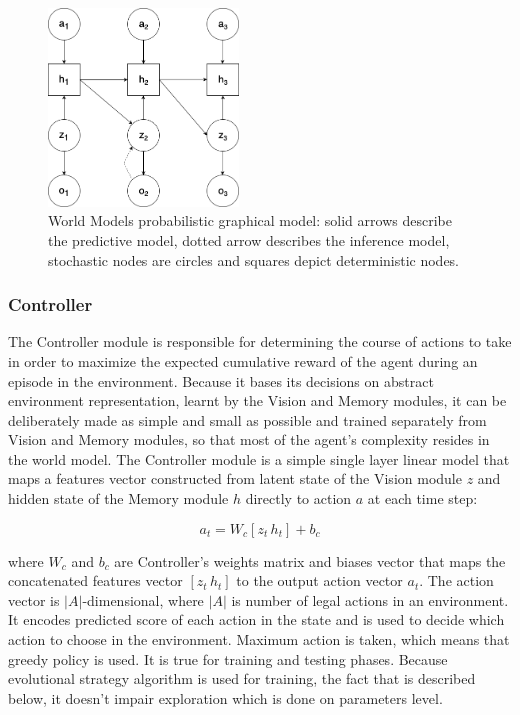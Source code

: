 \begin{figure}[H]
\includegraphics[width=0.45\textwidth,keepaspectratio]{figures/WorldModels/prob_graph_model.png}
\caption[World Models probabilistic graphical model]{World Models probabilistic graphical model: solid arrows describe the predictive model, dotted arrow describes the inference model, stochastic nodes are circles and squares depict deterministic nodes.}
\label{Fig.WorldModelsPGM}
\end{figure}

\subsubsection{Controller}

The Controller module is responsible for determining the course of actions to take in order to maximize the expected cumulative reward of the agent during an episode in the environment. Because it bases its decisions on abstract environment representation, learnt by the Vision and Memory modules, it can be deliberately made as simple and small as possible and trained separately from Vision and Memory modules, so that most of the agent’s complexity resides in the world model. The Controller module is a simple single layer linear model that maps a features vector constructed from latent state of the Vision module $z$ and hidden state of the Memory module $h$ directly to action $a$ at each time step:

$$a_t = W_c[z_t\,h_t] + b_c$$

where $W_c$ and $b_c$ are Controller's weights matrix and biases vector that maps the concatenated features vector $[z_t\,h_t]$ to the output action vector $a_t$. The action vector is $|A|$-dimensional, where $|A|$ is number of legal actions in an environment. It encodes predicted score of each action in the state and is used to decide which action to choose in the environment. Maximum action is taken, which means that greedy policy is used. It is true for training and testing phases. Because evolutional strategy algorithm is used for training, the fact that is described below, it doesn't impair exploration which is done on parameters level.

